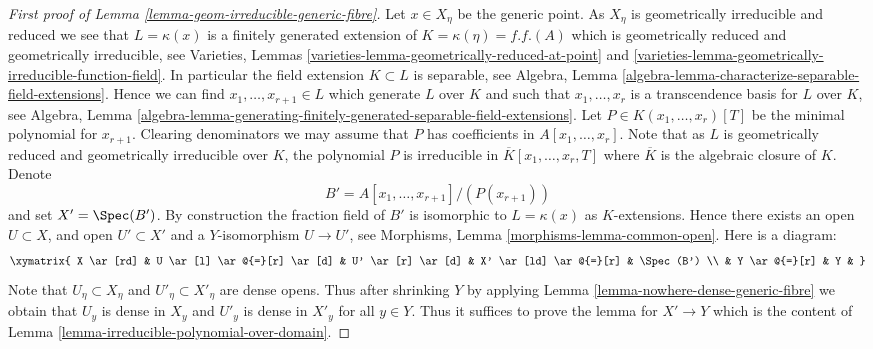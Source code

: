 \begin{proof}[First proof of Lemma \ref{lemma-geom-irreducible-generic-fibre}]
\medskip\noindent
Let $x \in X_\eta$ be the generic point. As $X_\eta$ is geometrically
irreducible and reduced we see that $L = \kappa(x)$ is a finitely generated
extension of $K = \kappa(\eta) = f.f.(A)$ which is geometrically reduced and
geometrically irreducible, see
Varieties, Lemmas \ref{varieties-lemma-geometrically-reduced-at-point} and
\ref{varieties-lemma-geometrically-irreducible-function-field}.
In particular the field extension $K \subset L$ is separable, see
Algebra, Lemma \ref{algebra-lemma-characterize-separable-field-extensions}.
Hence we can find $x_1, \ldots, x_{r + 1} \in L$ which generate $L$
over $K$ and such that $x_1, \ldots, x_r$ is a transcendence basis for
$L$ over $K$, see
Algebra, Lemma
\ref{algebra-lemma-generating-finitely-generated-separable-field-extensions}.
Let $P \in K(x_1, \ldots, x_r)[T]$ be the minimal polynomial for
$x_{r + 1}$. Clearing denominators we may assume that
$P$ has coefficients in $A[x_1, \ldots, x_r]$.
Note that as $L$ is geometrically reduced and geometrically irreducible
over $K$, the polynomial $P$ is irreducible in
$\overline{K}[x_1, \ldots, x_r, T]$ where $\overline{K}$ is the
algebraic closure of $K$. Denote
$$
B' = A[x_1, \ldots, x_{r + 1}]/(P(x_{r + 1}))
$$
and set $X' = \Spec(B')$. By construction the fraction field of $B'$
is isomorphic to $L = \kappa(x)$ as $K$-extensions. Hence there exists an
open $U \subset X$, and open $U' \subset X'$ and a $Y$-isomorphism
$U \to U'$, see
Morphisms, Lemma \ref{morphisms-lemma-common-open}.
Here is a diagram:
$$
\xymatrix{
X \ar[rd] &
U \ar[l] \ar@{=}[r] \ar[d] &
U' \ar[r] \ar[d] &
X' \ar[ld] \ar@{=}[r] & \Spec(B') \\
& Y \ar@{=}[r] & Y &
}
$$
Note that $U_\eta \subset X_\eta$ and $U'_\eta \subset X'_\eta$ are
dense opens. Thus after shrinking $Y$ by applying
Lemma \ref{lemma-nowhere-dense-generic-fibre}
we obtain that $U_y$ is dense in $X_y$ and $U'_y$ is dense in $X'_y$
for all $y \in Y$. Thus it suffices to prove the lemma for
$X' \to Y$ which is the content of
Lemma \ref{lemma-irreducible-polynomial-over-domain}.
\end{proof}

